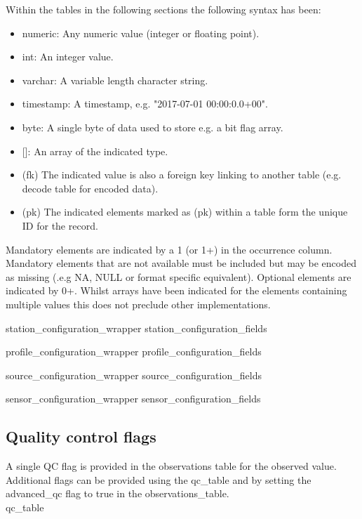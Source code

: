 \documentclass[a4paper,11pt]{article}
\begin{document}
Within the tables in the following sections the following syntax has been:\\
\begin{itemize}
\item numeric: \tabto{3 cm} Any numeric value (integer or floating point).
\item int: \tabto{3 cm} An integer value.
\item varchar: \tabto{3 cm} A variable length character string.
\item timestamp: \tabto{3 cm} A timestamp, e.g. "2017-07-01 00:00:0.0+00".
\item byte: \tabto{3 cm} A single byte of data used to store e.g. a bit flag array. 
\item {[]}:\tabto{3 cm} An array of the indicated type.
\item (fk) \tabto{3 cm} The indicated value is also a foreign key linking to another table (e.g. decode table for encoded data).
\item (pk) \tabto{3 cm} The indicated elements marked as (pk) within a table form the unique ID for the record.
\end {itemize}

Mandatory elements are indicated by a 1 (or 1+) in the occurrence column. Mandatory elements that are not available must be included but may be encoded as missing (.e.g NA, NULL or format specific equivalent). Optional elements are indicated by 0+. Whilst arrays have been indicated for the elements containing multiple values this does not preclude other implementations. 





 {station_configuration_wrapper}
 {station_configuration_fields}

 {profile_configuration_wrapper}
 {profile_configuration_fields}

 {source_configuration_wrapper}
 {source_configuration_fields}

 {sensor_configuration_wrapper}
 {sensor_configuration_fields}

\subsection {Quality control flags}
A single QC flag is provided in the observations table for the observed value. Additional flags can be provided using the qc\_table and by setting the advanced\_qc flag to true in the observations\_table.\\
 {qc_table}
\end{document}

